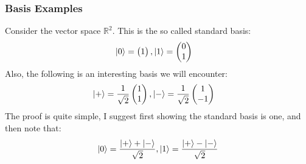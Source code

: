 \documentclass{beamer}
\begin{document}
\begin{frame}
    \frametitle{Basis Examples}
    \begin{example}
        Consider the vector space $\mathbb{R}^2$. This is the so called standard basis:
        \begin{align}
            \ket{0} & = \begin{pmatrix}
                1 \\
            \end{pmatrix}, \ket{1} = \begin{pmatrix}
                0 \\
                1
            \end{pmatrix}
        \end{align}
        Also, the following is an interesting basis we will encounter:
        \begin{align}
            \ket{+} & = \frac{1}{\sqrt{2}} \begin{pmatrix}
                1 \\
                1
            \end{pmatrix}, \ket{-} = \frac{1}{\sqrt{2}} \begin{pmatrix}
                1 \\
                -1
            \end{pmatrix}
        \end{align}
        The proof is quite simple, I suggest first showing the standard basis is one, and then note that:
        \[ \ket{0} = \frac{\ket{+} + \ket{-}}{\sqrt{2}}, \ket{1} = \frac{\ket{+} - \ket{-}}{\sqrt{2}} \]
    \end{example}
\end{frame}
\end{document}
